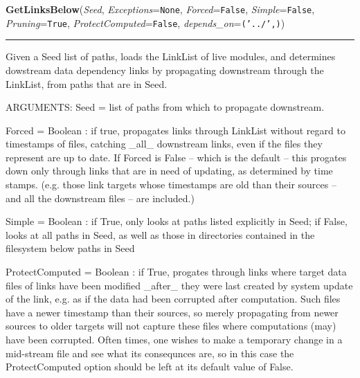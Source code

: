     \label{System:LinkManagement:GetLinksBelow}

    \vspace{0.5ex}

\hspace{.8\funcindent}\begin{boxedminipage}{\funcwidth}

    \raggedright \textbf{GetLinksBelow}(\textit{Seed}, \textit{Exceptions}={\tt None}, \textit{Forced}={\tt False}, \textit{Simple}={\tt False}, \textit{Pruning}={\tt True}, \textit{ProtectComputed}={\tt False}, \textit{depends\_on}={\tt ('../',)})

    \vspace{-1.5ex}

    \rule{\textwidth}{0.5\fboxrule}
\setlength{\parskip}{2ex}
    Given a Seed list of paths, loads the LinkList of live modules, and 
    determines dowstream data dependency links by propagating downstream 
    through the LinkList, from paths that are in Seed.

    ARGUMENTS: Seed = list of paths from which to propagate downstream.

    Forced = Boolean : if true, propagates links through LinkList without 
    regard to timestamps of files, catching \_all\_ downstream links, even 
    if the files they represent are up to date. If Forced is False -- which
    is the default -- this progates down only through links that are in 
    need of updating, as determined by time stamps. (e.g. those link 
    targets whose timestamps are old than their sources -- and all the 
    downstream files -- are included.)

    Simple = Boolean : if True, only looks at paths listed explicitly in 
    Seed; if False, looks at all paths in Seed, as well as those in 
    directories contained in the filesystem below  paths in Seed

    ProtectComputed = Boolean : if True, progates through links where 
    target data files of links have been modified \_after\_ they were last 
    created by system update of the link, e.g. as if the data had been 
    corrupted after computation. Such files have a newer timestamp than 
    their sources, so merely propagating from newer sources to older 
    targets will not capture these files where computations (may) have been
    corrupted.     Often times, one wishes to make a temporary change in a 
    mid-stream file and see what its consequnces are, so in this case the 
    ProtectComputed option should be left at its default value of False.


\end{boxedminipage}
